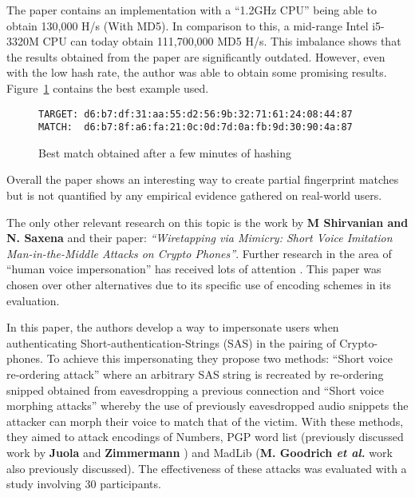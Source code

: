 The paper contains an implementation with a ``1.2GHz CPU'' being able to obtain 130,000 H/s (With MD5). In comparison to this, a mid-range Intel i5-3320M CPU can today obtain 111,700,000 MD5 H/s. This imbalance shows that the results obtained from the paper are significantly outdated. However, even with the low hash rate, the author was able to obtain some promising results. Figure~\ref{ref:fuzz} contains the best example used.

\begin{figure}[!h]
    \begin{center}
        \verb|TARGET: d6:b7:df:31:aa:55:d2:56:9b:32:71:61:24:08:44:87|
        \verb|MATCH:  d6:b7:8f:a6:fa:21:0c:0d:7d:0a:fb:9d:30:90:4a:87|
    \end{center}
    \caption{Best match obtained after a few minutes of hashing}
    \label{ref:fuzz}
\end{figure}

Overall the paper shows an interesting way to create partial fingerprint matches but is not quantified by any empirical evidence gathered on real-world users. 

The only other relevant research on this topic is the work by \textbf{M Shirvanian and N. Saxena}\cite{shirvanian2014wiretapping} 
and their paper: \textit{``Wiretapping via Mimicry: Short 
Voice Imitation Man-in-the-Middle Attacks on Crypto 
Phones''}. Further research in the area of ``human voice impersonation'' has received lots of attention \cite{mukhopadhyay2015all}\cite{chen2017you}\cite{wu2015spoofing}. This paper was chosen over other alternatives due to its specific use of encoding schemes in its evaluation.

In this paper, the authors develop a way to 
impersonate users when authenticating 
Short-authentication-Strings (SAS) in the pairing of 
Crypto-phones. To achieve this impersonating they propose 
two methods: ``Short voice re-ordering attack'' where an 
arbitrary SAS string is recreated by re-ordering snipped 
obtained from eavesdropping a previous connection
and ``Short voice morphing attacks'' whereby the use of 
previously eavesdropped audio snippets the attacker can
morph their voice to match that of the victim. With 
these methods, they aimed to attack encodings of Numbers, 
PGP word list (previously discussed work by \textbf{Juola} and 
\textbf{Zimmermann} \cite{juola1996whole}) and MadLib (\textbf{M. Goodrich 
\textit{et al.}}\cite{goodrich2006loud} work also 
previously discussed). The effectiveness of these attacks 
was evaluated with a study involving 30 participants.


